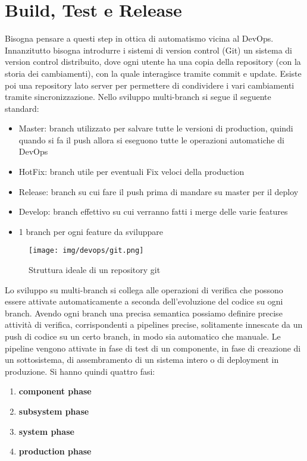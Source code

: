 \section{Build, Test e Release}
Bisogna pensare a questi step in ottica di automatismo vicina al DevOps.
Innanzitutto bisogna introdurre i sistemi di version control (Git) un sistema di
version control distribuito, dove ogni utente ha una copia della repository
(con la storia dei cambiamenti), con la quale interagisce tramite commit e update.
Esiste poi una repository lato server per permettere di condividere i vari
cambiamenti tramite sincronizzazione. Nello sviluppo multi-branch si segue il 
seguente standard:
\begin{itemize}
	\item Master: branch utilizzato per salvare tutte le versioni di production, 
      quindi quando si fa il push allora si eseguono tutte le operazioni 
      automatiche di DevOps
	\item HotFix: branch utile per eventuali Fix veloci della production
	\item Release: branch su cui fare il push prima di mandare su master per 
      il deploy
	\item Develop: branch effettivo su cui verranno fatti i merge delle 
      varie features
	\item 1 branch per ogni feature da sviluppare	
\end{itemize}

\begin{figure}[!ht]
    \centering
    \texttt{[image: img/devops/git.png]}
    \caption{Struttura ideale di un repository git}
    \label{fig:git}
\end{figure}

Lo sviluppo su multi-branch si collega alle operazioni di verifica che possono
essere attivate automaticamente a seconda dell'evoluzione del codice su ogni branch.
Avendo ogni branch una precisa semantica possiamo definire precise attività di
verifica, corrispondenti a pipelines precise, solitamente innescate da un push di
codice su un certo branch, in modo sia automatico che manuale.
Le pipeline vengono attivate in fase di test di un componente, in fase di creazione
di un sottosistema, di assembramento di un sistema intero o di deployment in
produzione. Si hanno quindi quattro fasi:
\begin{enumerate}
    \item \textbf{component phase}
    \item \textbf{subsystem phase}
    \item \textbf{system phase}
    \item \textbf{production phase}
\end{enumerate}

